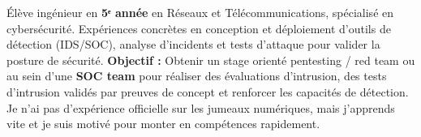 
\begin{cvparagraph}

    Élève ingénieur en \textbf{5ᵉ année} en Réseaux et Télécommunications, spécialisé en cybersécurité. Expériences concrètes en conception et déploiement d'outils de détection (IDS/SOC), analyse d'incidents et tests d'attaque pour valider la posture de sécurité.
    \newline
    \textbf{Objectif :} Obtenir un stage orienté pentesting / red team ou au sein d'une \textbf{SOC team} pour réaliser des évaluations d'intrusion, des tests d'intrusion validés par preuves de concept et renforcer les capacités de détection. Je n'ai pas d'expérience officielle sur les jumeaux numériques, mais j'apprends vite et je suis motivé pour monter en compétences rapidement.

\end{cvparagraph}
